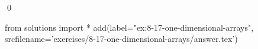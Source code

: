 
\begin{ex}
  \label{ex:8-17-one-dimensional-arrays}
  
  \qed
\end{ex}
\begin{python0}
from solutions import *
add(label="ex:8-17-one-dimensional-arrays",
    srcfilename='exercises/8-17-one-dimensional-arrays/answer.tex')
\end{python0}
